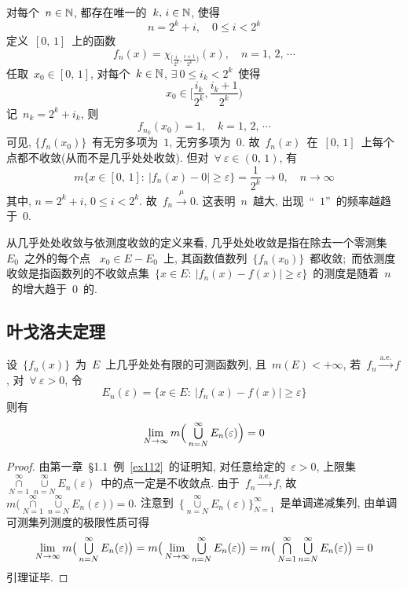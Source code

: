 \begin{example}[依测度收敛但不几乎处处收敛]
对每个~$n \in \mathbb{N}$, 都存在唯一的~$k,\,i \in \mathbb{N}$, 使得
\[
n = 2^k + i, \quad 0 \leqslant i < 2^k
\]
定义~$[0,\,1]$~上的函数
\[
f_n(x) = \chi_{[\frac{i}{2^k},\frac{i+1}{2^k})} (x), \quad n = 1,\,2,\,\cdots
\]
任取~$x_0 \in [0,\,1]$, 对每个~$k \in \mathbb{N}$, $\exists~0 \leqslant i_k < 2^k$~使得
\[
x_0 \in \big[\frac{i_k}{2^k},\frac{i_k+1}{2^k}\big)
\]
记~$n_k = 2^k + i_k$, 则
\[
f_{n_k}(x_0) = 1, \quad k = 1,\, 2,\,\cdots
\]
可见, $\{f_n(x_0)\}$~有无穷多项为~$1$, 无穷多项为~$0$. 故~$f_n(x)$~在~$[0,\,1]$~上每个点都不收敛(从而不是几乎处处收敛). 但对~$\forall~\varepsilon \in (0, \,1)$, 有
\[
m\big\{ x \in [0,\,1]: \: |f_n(x) - 0| \geqslant \varepsilon \big\} = \frac{1}{2^k} \to 0, \quad n \to \infty
\]
其中, $n = 2^k + i, \, 0 \leqslant i < 2^k$. 故~$f_n \xrightarrow{~\mu~} 0$. 这表明~$n$~越大, 出现~``~$1$''~的频率越趋于~$0$.
\end{example}

从几乎处处收敛与依测度收敛的定义来看, 几乎处处收敛是指在除去一个零测集~$E_0$~之外的每个点
~$x_0 \in E - E_0$~上, 其函数值数列~$\{f_n(x_0)\}$~都收敛;\
而依测度收敛是指函数列的不收敛点集~$\{x \in E: \: |f_n(x) - f(x)| \geqslant \varepsilon\}$~的测度是随着~$n$~的增大趋于~$0$~的.

\subsection{叶戈洛夫定理}

\begin{lemma} \label{lem321}
设~$\{f_n(x)\}$~为~$E$~上几乎处处有限的可测函数列, 且~$m(E) < +\infty$, 若~$f_n \xrightarrow{\mathrm{a.e.}} f$, 对~$\forall~\varepsilon > 0$, 令
\[
E_n(\varepsilon) = \big\{ x \in E: \: |f_n(x) - f(x)| \geqslant \varepsilon \big\}
\]
则有
\[
\lim_{N \to \infty} m \Big( \mathop{\textstyle{\bigcup}}_{n=N}^\infty E_n(\varepsilon) \Big) = 0
\]
\end{lemma}

\begin{proof}
由第一章~\S1.1~例~\ref{ex112}~的证明知, 对任意给定的~$\varepsilon > 0$, 上限集~$\mathop{\cap}\limits_{N=1}^\infty \mathop{\cup}\limits_{n = N}^\infty E_n(\varepsilon)$~中的点一定是不收敛点. 由于~$f_n \xrightarrow{\mathrm{a.e.}} f$, 故
~$m\big( \mathop{\cap}\limits_{N=1}^\infty \mathop{\cup}\limits_{n = N}^\infty E_n(\varepsilon) \big) = 0$. 注意到~$\big\{ \mathop{\cup}\limits_{n = N}^\infty E_n(\varepsilon) \big\}^\infty_{N=1}$~是单调递减集列, 由单调可测集列测度的极限性质可得
\[
\lim_{N \to \infty} m \big( \mathop{\textstyle{\bigcup}}_{n=N}^\infty E_n(\varepsilon) \big) =  m \big( \lim_{N \to \infty} \mathop{\textstyle{\bigcup}}_{n=N}^\infty E_n(\varepsilon) \big)= m\big( \mathop{\textstyle{\bigcap}}\limits_{N=1}^\infty \mathop{\textstyle{\bigcup}}\limits_{n = N}^\infty E_n(\varepsilon) \big) = 0
\]
引理证毕.
\end{proof}


